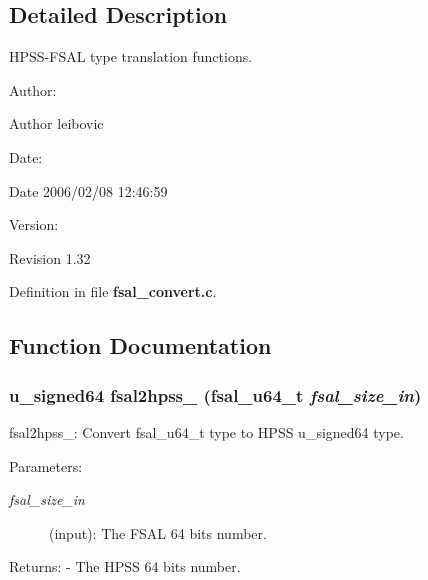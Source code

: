 \subsection{Detailed Description}
HPSS-FSAL type translation functions. 

\begin{Desc}
\item[Author:]\begin{Desc}
\item[Author]leibovic \end{Desc}
\end{Desc}
\begin{Desc}
\item[Date:]\begin{Desc}
\item[Date]2006/02/08 12:46:59 \end{Desc}
\end{Desc}
\begin{Desc}
\item[Version:]\begin{Desc}
\item[Revision]1.32 \end{Desc}
\end{Desc}


Definition in file {\bf fsal\_\-convert.c}.

\subsection{Function Documentation}
\subsubsection{\setlength{\rightskip}{0pt plus 5cm}u\_\-signed64 fsal2hpss\_ (fsal\_\-u64\_\-t {\em fsal\_\-size\_\-in})}\label{fsal__convert_8c_a10}


fsal2hpss\_: Convert fsal\_\-u64\_\-t type to HPSS u\_\-signed64 type.

\begin{Desc}
\item[Parameters:]
\begin{description}
\item[{\em fsal\_\-size\_\-in}](input): The FSAL 64 bits number.\end{description}
\end{Desc}
\begin{Desc}
\item[Returns:]- The HPSS 64 bits number. \end{Desc}


